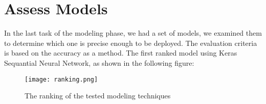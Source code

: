 \section{Assess Models}

In the last task of the modeling phase, we had a set of models, we examined them to determine which one is precise enough to be deployed.\newline \newline
The evaluation criteria is based on the accuracy as a method.\newline \newline
The first ranked model using Keras Sequantial Neural Network, as shown in the following figure:
\begin{figure}[H]
\begin{center}
\texttt{[image: ranking.png]}
\end{center}
\caption{The ranking of the tested modeling techniques}
\label{fig:ranking}
\end{figure}
